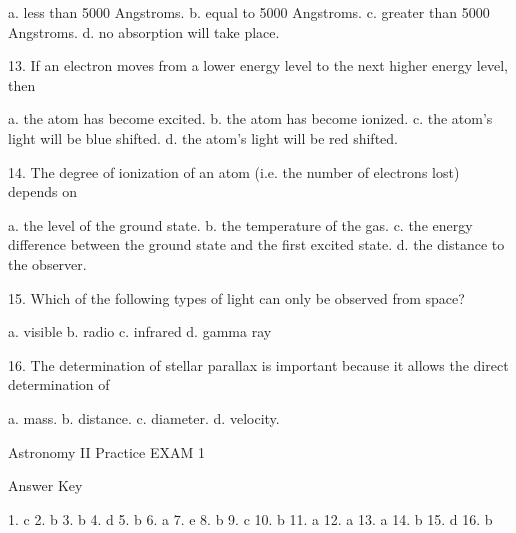a. less than 5000 Angstroms.
b. equal to 5000 Angstroms.
c. greater than 5000 Angstroms.
d. no absorption will take place.

13. If an electron moves from a lower energy level to the next higher energy level, then

a. the atom has become excited.
b. the atom has become ionized.
c. the atom's light will be blue shifted.
d. the atom's light will be red shifted.

14. The degree of ionization of an atom (i.e. the number of electrons lost) depends on

a. the level of the ground state.
b. the temperature of the gas.
c. the energy difference between the ground state and the first excited state.
d. the distance to the observer.

15. Which of the following types of light can only be observed from space?

a. visible
b. radio
c. infrared
d. gamma ray

16. The determination of stellar parallax is important because it allows the direct determination of

a. mass.
b. distance.
c. diameter.
d. velocity.


Astronomy II Practice EXAM 1

Answer Key

1. c
2. b
3. b
4. d
5. b
6. a
7. e
8. b
9. c
10. b
11. a
12. a
13. a
14. b
15. d
16. b 


